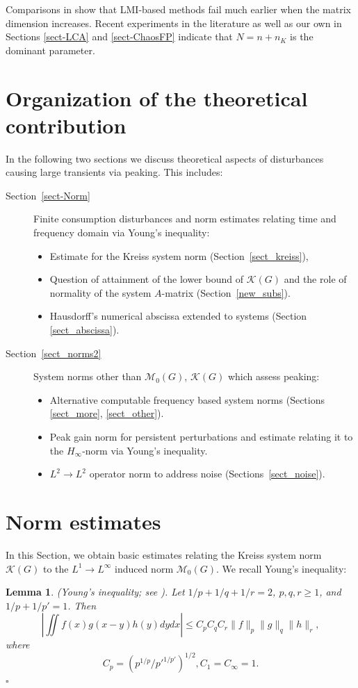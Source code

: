 \documentclass[12pt, a4paper,reqno]{amsart}
\newtheorem{lemma}{\bf Lemma}
\theoremstyle{definition}
\begin{document}
Comparisons
in \cite{an_kreiss} show that LMI-based methods fail
much earlier when the matrix dimension increases. Recent experiments in the literature as well as our own 
in Sections \ref{sect-LCA} and \ref{sect-ChaosFP} indicate that
$N=n+n_K$ is the dominant parameter. 



\section*{Organization of the theoretical contribution}
In the following two sections we discuss theoretical aspects of disturbances causing
large transients via peaking. This includes:
\begin{description}
  \item[Section~\ref{sect-Norm}] 
  Finite consumption disturbances and 
   norm estimates relating time and frequency domain via Young's inequality:
  \begin{itemize}
    \item  Estimate for the Kreiss system norm (Section~\ref{sect_kreiss}),
    \item  Question of attainment of the lower bound of $\mathcal K(G)$ and the role of normality of the system $A$-matrix (Section~\ref{new_subs}).
    \item Hausdorff's numerical abscissa extended to systems
    (Section \ref{sect_abscissa}).
\end{itemize}


    \item[Section~\ref{sect_norms2}] 
    System norms other than $\mathcal M_0(G)$, $\mathcal K(G)$ which assess peaking:
    \begin{itemize}
    \item Alternative computable frequency based system norms (Sections \ref{sect_more}, \ref{sect_other}).
  \item
  Peak gain norm for 
   persistent perturbations and 
   estimate relating it to the  $H_\infty$-norm via Young's inequality. 
    \item  $L^2 \to L^2$ operator norm to address noise (Sections~\ref{sect_noise}).
  \end{itemize}
\end{description}



\section{Norm estimates \label{sect-Norm}}
In this Section, we obtain basic estimates relating the Kreiss system norm $\mathcal K(G)$ to
the  $L^1 \to L^\infty$ induced norm $\mathcal M_0(G)$.
%
We
recall Young's inequality:
\begin{lemma}
\label{lemma_young}
{\rm (Young's inequality; see \cite{best_young})}.
Let $1/p+1/q+1/r=2$, $p,q,r\geq 1$, and $1/p+1/p'=1$. Then
$$
\left|
\iint f(x) g(x-y) h(y) dy dx
\right| \leq C_{p}C_qC_{r} \|f\|_p\|g\|_q\|h\|_r,
$$
where
$$
C_p= \left( p^{1/p} \big/ p'^{1/p'}  \right)^{1/2}, C_1 = C_\infty = 1.
$$
\hfill $\square$
\end{lemma}
\end{document}
